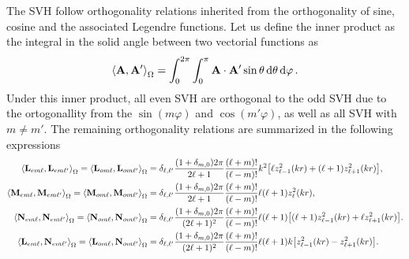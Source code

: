 The SVH follow orthogonality relations inherited from the orthogonality of sine, cosine and the associated Legendre functions. Let us define the inner product as the integral in the solid angle between two vectorial functions as 
%
\begin{align}
\ev{\vb{A},\vb{A}'}_\Omega = \int_0^{2\pi}\int_0^{\pi} \vb{A}\cdot\vb{A}'\sin\theta\dd{\theta}\dd{\varphi}.
\label{eq:inner}
\end{align}
%
Under this inner product, all even SVH are orthogonal to the odd SVH due to the ortogonallity from the $\sin(m\varphi)$ and $\cos(m'\varphi)$, as well as all SVH  with $m\neq m'$. The remaining orthogonality relations are summarized in the following expressions \cite{stratton_electromagnetic_2012}
%
\begin{align}
\ev{\vb{L}_{em\ell},\vb{L}_{em\ell'}}_\Omega = \ev{\vb{L}_{om\ell},\vb{L}_{om\ell'}}_\Omega &= \delta_{\ell,\ell'}\frac{(1+\delta_{m,0})2\pi}{2\ell+1}\frac{(\ell+m)!}{(\ell-m)!}k^2\qty[ \ell z_{\ell-1}^2(kr) + (\ell+1)z_{\ell+1}^2(kr) ],\\
%
\ev{\vb{M}_{em\ell},\vb{M}_{em\ell'}}_\Omega = \ev{\vb{M}_{om\ell},\vb{M}_{om\ell'}}_\Omega &= \delta_{\ell,\ell'}\frac{(1+\delta_{m,0})2\pi}{2\ell+1}\frac{(\ell+m)!}{(\ell-m)!}\ell(\ell+1)z_{\ell}^2(kr),\\
%
\ev{\vb{N}_{em\ell},\vb{N}_{em\ell'}}_\Omega = \ev{\vb{N}_{om\ell},\vb{N}_{om\ell'}}_\Omega &= \delta_{\ell,\ell'}\frac{(1+\delta_{m,0})2\pi}{(2\ell+1)^2}\frac{(\ell+m)!}{(\ell-m)!}\ell(\ell+1)\qty[ (\ell+1) z_{\ell-1}^2(kr) + \ell z_{\ell+1}^2(kr) ]. \\
\ev{\vb{L}_{em\ell},\vb{N}_{em\ell'}}_\Omega = \ev{\vb{L}_{om\ell},\vb{N}_{om\ell'}}_\Omega &= \delta_{\ell,\ell'}\frac{(1+\delta_{m,0})2\pi}{(2\ell+1)^2}\frac{(\ell+m)!}{(\ell-m)!}\ell(\ell+1)k\qty[ z_{\ell-1}^2(kr) - z_{\ell+1}^2(kr) ]. 
\end{align}
%
















































